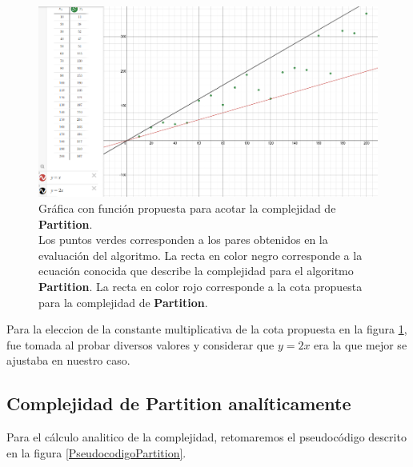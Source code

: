         \begin{figure}[h!]
            \centering
            \includegraphics[width=13cm]{QuickSort/desmos-partition.png}
            \caption{Gráfica con función propuesta para acotar la complejidad de \textbf{Partition}. \\Los puntos verdes corresponden a los pares obtenidos en la evaluación del algoritmo. La recta en color negro corresponde a la ecuación conocida que describe la complejidad para el algoritmo \textbf{Partition}. La recta en color rojo corresponde a la cota propuesta para la complejidad de \textbf{Partition}.}
            \label{GraficaDesmosPartition}
        \end{figure}
        
        Para la eleccion de la constante multiplicativa de la cota propuesta en la figura \ref{GraficaDesmosPartition}, fue tomada al probar diversos valores y considerar que $y=2x$ era la que mejor se ajustaba en nuestro caso.
        
        
    \subsection*{Complejidad de \textbf{Partition} analíticamente}
        Para el cálculo analitico de la complejidad, retomaremos el pseudocódigo descrito en la figura \ref{PseudocodigoPartition}.
        

